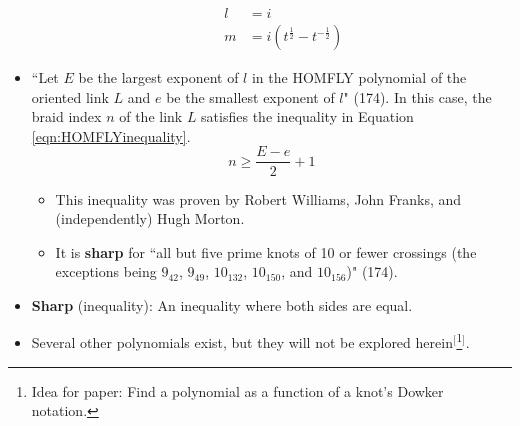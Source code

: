 \documentclass[titlepage]{article}
\numberwithin{figure}{section}
\numberwithin{table}{section}
\numberwithin{equation}{section}
\newcommand{\dq}[2]{``#1" (#2).}
\begin{document}
\begin{itemize}
\begin{itemize}
\begin{align*}
            l &= i\\
            m &= i\left( t^\frac{1}{2}-t^{-\frac{1}{2}} \right)
        \end{align*}
    \end{itemize}
    \item \dq{Let $E$ be the largest exponent of $l$ in the HOMFLY polynomial of the oriented link $L$ and $e$ be the smallest exponent of $l$}{174} In this case, the braid index $n$ of the link $L$ satisfies the inequality in Equation \ref{eqn:HOMFLYinequality}.
    \begin{equation}\label{eqn:HOMFLYinequality}
        n\geq\frac{E-e}{2}+1
    \end{equation}
    \begin{itemize}
        \item This inequality was proven by Robert Williams, John Franks, and (independently) Hugh Morton.
        \item It is \textbf{sharp} for \dq{all but five prime knots of 10 or fewer crossings (the exceptions being $9_{42}$, $9_{49}$, $10_{132}$, $10_{150}$, and $10_{156}$)}{174}
    \end{itemize}
    \item \textbf{Sharp} (inequality): An inequality where both sides are equal.
    \item Several other polynomials exist, but they will not be explored herein$^[$\footnote{Idea for paper: Find a polynomial as a function of a knot's Dowker notation.}$^]$.
\end{itemize}
\end{document}
